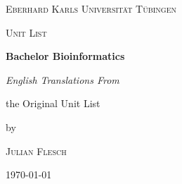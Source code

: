 \documentclass[a4paper]{report}
\begin{document}
	\begin{titlepage}
		\centering
		
		{\scshape\LARGE Eberhard Karls Universität Tübingen \par}
		\vspace{1cm}
		{\scshape\Large Unit List \par}
		\vspace{1.5cm}
		{\huge\bfseries Bachelor Bioinformatics \par}
		\vspace{2cm}
		{\Large\itshape English Translations From \par the Original Unit List \par}
		\vfill
		by \par
		\textsc{Julian Flesch}
		
		\vfill
		
		{\large \today\par}
	\end{titlepage}
	
	\tableofcontents
	
	
	
%	
	
%	
%	
	
\end{document}
